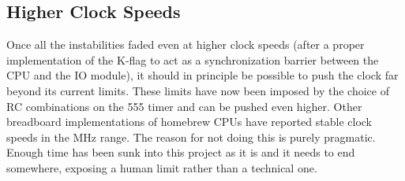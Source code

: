 \subsection{Higher Clock Speeds} Once all the instabilities faded even at higher clock speeds (after a proper implementation of the K-flag to act as a synchronization barrier between the CPU and the IO module), it should in principle be possible to push the clock far beyond its current limits. These limits have now been imposed by the choice of RC combinations on the 555 timer and can be pushed even higher. Other breadboard implementations of homebrew CPUs have reported stable clock speeds in the MHz range. The reason for not doing this is purely pragmatic. Enough time has been sunk into this project as it is and it needs to end somewhere, exposing a human limit rather than a technical one.


